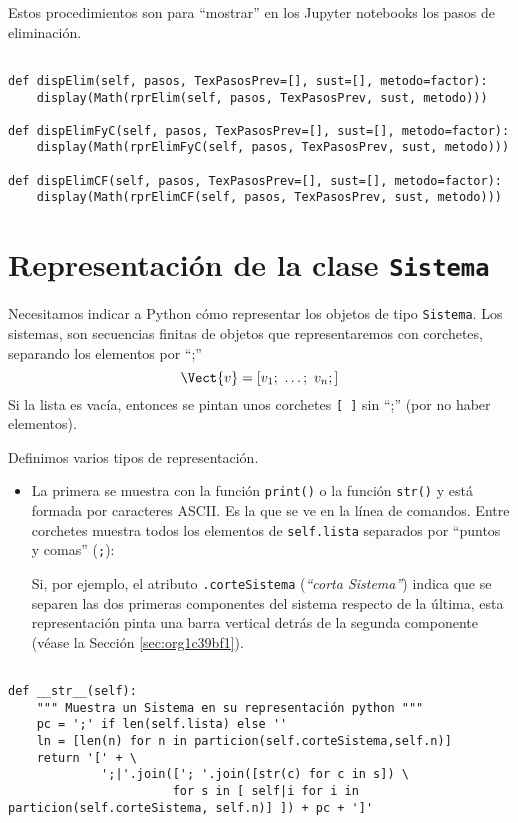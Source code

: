 \documentclass[11pt]{report}
\begin{document}
Estos procedimientos son para ``mostrar'' en los Jupyter notebooks los pasos de eliminación.

\begin{verbatim}

def dispElim(self, pasos, TexPasosPrev=[], sust=[], metodo=factor):
    display(Math(rprElim(self, pasos, TexPasosPrev, sust, metodo)))

def dispElimFyC(self, pasos, TexPasosPrev=[], sust=[], metodo=factor):
    display(Math(rprElimFyC(self, pasos, TexPasosPrev, sust, metodo)))

def dispElimCF(self, pasos, TexPasosPrev=[], sust=[], metodo=factor):
    display(Math(rprElimCF(self, pasos, TexPasosPrev, sust, metodo)))

\end{verbatim}

\section{Representación de la clase \texttt{Sistema}}
\label{sec:org6766cc0}
Necesitamos indicar a Python cómo representar los objetos de tipo
\texttt{Sistema}. Los sistemas, son secuencias finitas de objetos que
representaremos con corchetes, separando los elementos por ``;''
\begin{displaymath}
  \Vect{v}=[v_1;\ \ldots;\ v_n;]
\end{displaymath}
Si la lista es vacía, entonces se pintan unos corchetes \texttt{[ ]} sin
 ``;'' (por no haber elementos). 

Definimos varios tipos de representación.

\begin{itemize}
\item La primera se muestra con la función \texttt{print()} o la función \texttt{str()}
y está formada por caracteres ASCII. Es la que se ve en la línea de
comandos. Entre corchetes muestra todos los elementos de
\texttt{self.lista} separados por ``puntos y comas'' (\texttt{;}):

Si, por ejemplo, el atributo \texttt{.corteSistema} (\emph{``corta Sistema''}) indica que
se separen las dos primeras componentes del sistema respecto de la
última, esta representación pinta una barra vertical detrás de la
segunda componente (véase la Sección \ref{sec:org1c39bf1}).
\end{itemize}

\begin{verbatim}

def __str__(self):
    """ Muestra un Sistema en su representación python """
    pc = ';' if len(self.lista) else ''
    ln = [len(n) for n in particion(self.corteSistema,self.n)]
    return '[' + \
             ';|'.join(['; '.join([str(c) for c in s]) \
                       for s in [ self|i for i in particion(self.corteSistema, self.n)] ]) + pc + ']'

\end{verbatim}
\end{document}
